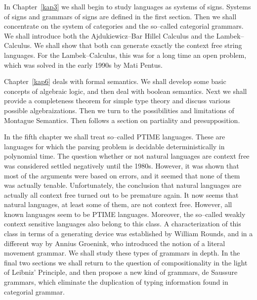 In Chapter~\ref{kap3} we shall begin to study languages as 
systems of signs. Systems of signs and grammars of signs are 
defined in the first section.  Then we shall concentrate on 
the system of categories and
the so--called categorial grammars. We shall introduce
both the Ajdukiewicz--Bar Hillel Calculus and the
Lambek--Calculus. We shall show that both can generate exactly
the context free string languages. For the Lambek--Calculus,
this was for a long time an open problem, which was solved in
the early 1990s by Mati Pentus.

Chapter~\ref{kap6} deals with formal semantics. We shall develop
some basic concepts of algebraic logic, and then deal with boolean
semantics. Next we shall provide a completeness theorem for simple 
type theory and discuss various possible algebraizations. Then we 
turn to the possibilities and limitations of Montague Semantics. 
Then follows a section on partiality and presupposition. 

In the fifth chapter we shall treat so--called PTIME languages.
These are languages for which the parsing problem is decidable
deterministically in polynomial time. The question whether or not
natural languages are context free was considered settled negatively
until the 1980s. However, it was shown that most of the arguments were
based on errors, and it seemed that none of them was actually tenable.
Unfortunately, the conclusion that natural languages are actually all
context free turned out to be premature again. It now seems that natural
languages, at least some of them, are not context free. However, all 
known languages seem to be PTIME languages. Moreover, the so--called 
weakly context sensitive languages also belong to this class. 
A characterization of this class in terms of a generating device was 
established by William Rounds, 
and in a different way by Annius Groenink, 
who introduced the notion of a literal movement grammar. We shall 
study these types of grammars in depth. 
In the final two sections we shall return to the question
of compositionality in the light of Leibniz' Principle,
and then propose a new kind of grammars, de Saussure grammars,
which eliminate the duplication of typing information
found in categorial grammar.

